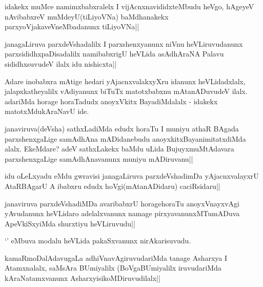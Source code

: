 \begin{artha}
idakekx muMce namimxbabxralelx I vijAcnxnavididxteMbudu heVgo, hAgeyeV nAvibabxreV muMdeyU(tiLiyoVNa) baMdhanakekx parxyoVjakaveVneMbadanunx tiLiyoVNa||
\end{artha}

\begin{artha}
janagaLiruva parxdeVshadalilx I parxshenxyanunx niVnu heVLiruvudanunx parxsididhxpaDisadalilx namibabxrigU heVLida asAdhAraNA Palavu sididhxsuvudeV ilalx idu nishicxta||
\end{artha}

\begin{artha}
Adare inobabxra mAtige hedari yAjacnxvalakxyXru idanunx heVLidadxlalx, jalapxkatheyalilx vAdiyanunx biTuTx matotxbabxnu mAtanADuvudeV ilalx. adariMda horage horaTadudx anoyxVkitx BayadiMdalalx - idakekx matotxMdukAraNavU ide.
\end{artha}

\begin{artha}
janaviruva(deVsha) sathxLadiMda edudx horaTu I muniyu athaR BAgada parxshenxgaLige samAdhAna mADidanebudu anoyxkitxBayanimitatxdiMda alalx. EkeMdare? adeV sathxLakekx baMdu uLida BujuyxmuMtAdavara parxshenxgaLige samAdhAnavanunx muniyu mADiruvanu||
\end{artha}


\begin{artha}
idu oLeLxyadu eMdu gwravisi janagaLiruva parxdeVshadimDa yAjacnxvalayxrU AtaRBAgarU A ibabxru edudx hoVgi(mAtanADidaru) caciRsidaru||
\end{artha}


\begin{artha}
janaviruva parxdeVshadiMDa avaribabxrU horagehoraTu anoyxVnayxvAgi yAvudanunx heVLidaro 
adelalxvanunx namage pirxyavanunxMTumADuva ApeVkiSxyiMda shurxtiyu heVLiruvudu||
\end{artha}


\begin{artha}
`\stext' eMbuva modalu heVLida pakaSxvanunx nirAkarisuvudu.
\end{artha}

\begin{artha}
kamaRmoDalAdavugaLa adhiVnavAgiruvudariMda tanage Asharxya I Atamxnalalx, saMsAra 
BUmiyalilx (BoVgaBUmiyalilx iruvudariMda kAraNatamxvanunx AsharxyisikoMDiruvudilalx||
\end{artha}


